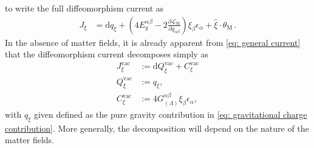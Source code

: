 \documentclass[]{jkpaper}
\theoremstyle{plain}
\theoremstyle{definition}
\newcommand{\sd}{\mathrm {d}}
\def\extd{\mathrm {d}}
\begin{document}
to write the full diffeomorphism current as
\begin{equation}\begin{split}\label{eq: general current}
    J_{\xi}
    &=\extd q_\xi + \left(4E^{\alpha\beta}_{g}-2\frac{\partial \mathcal{L}_{\text{M}}}{\partial g_{\alpha\beta}}\right)\xi_\beta\epsilon_\alpha
    +\hat{\xi}\cdot\theta_{\text{M}}\,.
\end{split}\end{equation} 
In the absence of matter fields, it is already apparent from \eqref{eq: general current} that the diffeomorphism current decomposes simply as
\begin{equation}\begin{split}\label{eq: diffeo current vacuum}
    J_\xi^{\text{vac}}&:=\sd Q^{\text{vac}}_\xi+C^{\text{vac}}_\xi\\
    Q^{\text{vac}}_\xi&:=q_\xi,\\
    C_\xi^{\text{vac}}&:=4G^{\alpha\beta}_{(\Lambda)}\xi_\beta\epsilon_\alpha,
\end{split}\end{equation}
with $q_\xi$ given defined as the pure gravity contribution in \eqref{eq: gravitational charge contribution}.
More generally, the decomposition will depend on the nature of the matter fields.
\end{document}
